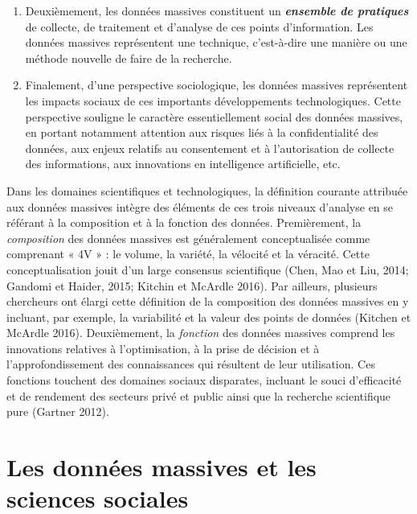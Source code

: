 \documentclass[
  letterpaper,
  DIV=11,
  numbers=noendperiod]{scrreprt}
\begin{document}
\begin{enumerate}
\def\labelenumi{\arabic{enumi}.}
\setcounter{enumi}{1}
\item
  Deuxièmement, les données massives constituent un
  \textbf{\emph{ensemble de pratiques}} de collecte, de traitement et
  d'analyse de ces points d'information. Les données massives
  représentent une technique, c'est-à-dire une manière ou une méthode
  nouvelle de faire de la recherche.
\item
  Finalement, d'une perspective sociologique, les données massives
  représentent les impacts sociaux de ces importants développements
  technologiques. Cette perspective souligne le caractère
  essentiellement social des données massives, en portant notamment
  attention aux risques liés à la confidentialité des données, aux
  enjeux relatifs au consentement et à l'autorisation de collecte des
  informations, aux innovations en intelligence artificielle, etc.
\end{enumerate}

Dans les domaines scientifiques et technologiques, la définition
courante attribuée aux données massives intègre des éléments de ces
trois niveaux d'analyse en se référant à la composition et à la fonction
des données. Premièrement, la \emph{composition} des données massives
est généralement conceptualisée comme comprenant « 4V » : le volume, la
variété, la vélocité et la véracité. Cette conceptualisation jouit d'un
large consensus scientifique (Chen, Mao et Liu, 2014; Gandomi et Haider,
2015; Kitchin et McArdle 2016). Par ailleurs, plusieurs chercheurs ont
élargi cette définition de la composition des données massives en y
incluant, par exemple, la variabilité et la valeur des points de données
(Kitchen et McArdle 2016). Deuxièmement, la \emph{fonction} des données
massives comprend les innovations relatives à l'optimisation, à la prise
de décision et à l'approfondissement des connaissances qui résultent de
leur utilisation. Ces fonctions touchent des domaines sociaux
disparates, incluant le souci d'efficacité et de rendement des secteurs
privé et public ainsi que la recherche scientifique pure (Gartner 2012).

\hypertarget{les-donnuxe9es-massives-et-les-sciences-sociales}{%
\section*{Les données massives et les sciences
sociales}\label{les-donnuxe9es-massives-et-les-sciences-sociales}}
\end{document}
